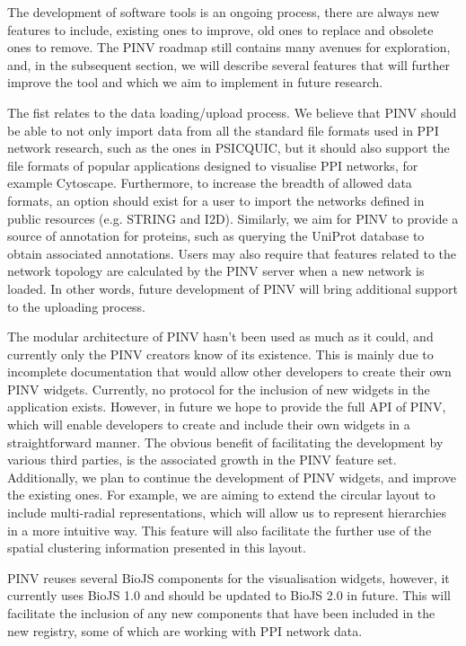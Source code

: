 The development of software tools is an ongoing process, there are always new features to include, existing ones to improve, old ones to replace and obsolete ones to remove. The PINV roadmap still contains many avenues for exploration, and, in the subsequent section, we will describe several features that will further improve the tool and which we aim to implement in future research.

The fist relates to the data loading/upload process. We believe that PINV should be able to not only import data from all the standard file formats used in PPI network research, such as the ones in PSICQUIC, but it should also support the file formats of popular applications designed to visualise PPI networks, for example Cytoscape. Furthermore, to increase the breadth of allowed data formats, an option should exist for a user to import the networks defined in public resources (e.g. STRING and I2D). Similarly, we aim for PINV to provide a source of annotation for proteins, such as querying the UniProt database to obtain associated annotations. Users may also require that features related to the network topology are calculated by the PINV server when a new network is loaded. In other words, future development of PINV will bring additional support to the uploading process.

The modular architecture of PINV hasn't been used as much as it could, and currently only the PINV creators know of its existence. This is mainly due to incomplete documentation that would allow other developers to create their own PINV widgets. Currently, no protocol for the inclusion of new widgets in the application exists. However, in future we hope to provide the full API of PINV, which will enable developers to create and include their own widgets in a straightforward manner.  The obvious benefit of facilitating the development by various third parties, is the associated growth in the PINV feature set. Additionally, we plan to continue the development of PINV widgets, and improve the existing ones.  For example, we are aiming to extend the circular layout to include multi-radial representations, which will allow us to represent hierarchies in a more intuitive way. This feature will also facilitate the further use of the spatial clustering information presented in this layout.

PINV reuses several BioJS components for the visualisation widgets, however, it currently uses BioJS 1.0 and should be updated to BioJS 2.0 in future. This will facilitate the inclusion of any new components that have been included in the new registry, some of which are working with PPI network data.


